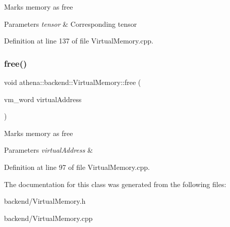 Marks memory as free 
\begin{DoxyParams}{Parameters}
{\em tensor} & Corresponding tensor \\
\hline
\end{DoxyParams}


Definition at line 137 of file Virtual\+Memory.\+cpp.

\mbox{\label{classathena_1_1backend_1_1_virtual_memory_ab24e17b8e8b2f8278b56b84dfdda42a3}} 
\subsubsection{\texorpdfstring{free()}{free()}\hspace{0.1cm}{\footnotesize\ttfamily [2/2]}}
{\footnotesize\ttfamily void athena\+::backend\+::\+Virtual\+Memory\+::free (\begin{DoxyParamCaption}\item[{vm\+\_\+word}]{virtual\+Address }\end{DoxyParamCaption})}

Marks memory as free 
\begin{DoxyParams}{Parameters}
{\em virtual\+Address} & \\
\hline
\end{DoxyParams}


Definition at line 97 of file Virtual\+Memory.\+cpp.



The documentation for this class was generated from the following files\+:\begin{DoxyCompactItemize}
\item 
backend/Virtual\+Memory.\+h\item 
backend/Virtual\+Memory.\+cpp\end{DoxyCompactItemize}

